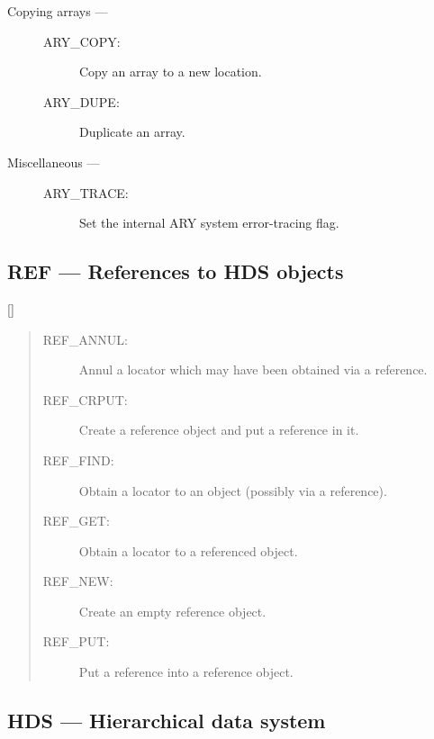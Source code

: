 \begin{description}
\item [Copying arrays ---]

\begin{description}
\item [ARY\_COPY:]  Copy an array to a new location.
\item [ARY\_DUPE:]  Duplicate an array.
\end{description}

\item [Miscellaneous ---]

\begin{description}
\item [ARY\_TRACE:]  Set the internal ARY system error-tracing flag.
\end{description}

\end{description}

\newpage

\subsection{REF --- References to HDS objects}
\label{R_REF}

\vspace{-9mm}

\hfill []

\vspace{2mm}

\begin{quote}
\begin{description}
\item [REF\_ANNUL:]  Annul a locator which may have been obtained via a reference.
\item [REF\_CRPUT:]  Create a reference object and put a reference in it.
\item [REF\_FIND:]  Obtain a locator to an object (possibly via a reference).
\item [REF\_GET:]  Obtain a locator to a referenced object.
\item [REF\_NEW:]  Create an empty reference object.
\item [REF\_PUT:]  Put a reference into a reference object.
\end{description}
\end{quote}

\newpage

\subsection{HDS --- Hierarchical data system}

